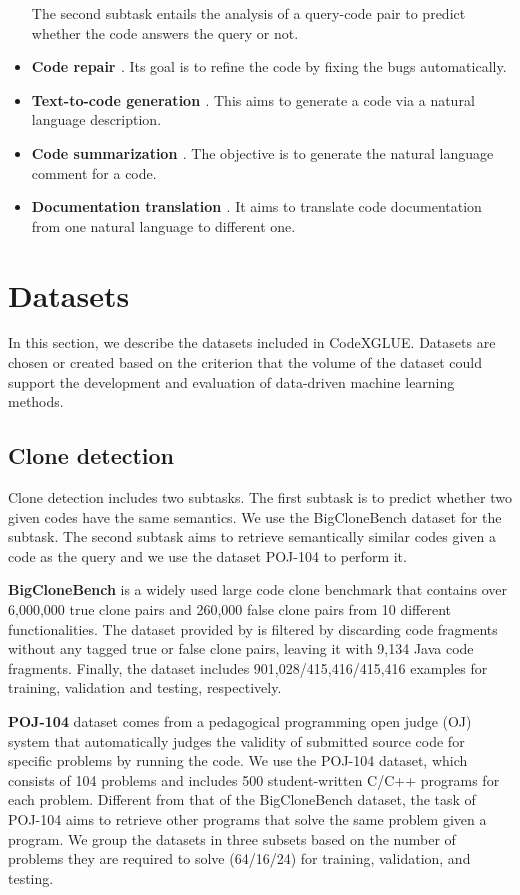 \documentclass[sigconf,nonacm,screen]{acmart}
\begin{document}
\begin{itemize}
The second subtask entails the analysis of a query-code pair to predict whether the code answers the query or not. 
\item \textbf{Code repair \cite{tufano2019empirical}}. Its goal is to  refine the code by fixing the bugs automatically. 
    \item \textbf{Text-to-code generation \cite{iyer2018mapping}}. This aims to  generate a code via a natural language description. 
    \item \textbf{Code summarization \cite{iyer2016summarizing}}. The objective is to generate the natural language comment for a code. 
    \item \textbf{Documentation translation \cite{johnson2017google}}. It aims to  translate code documentation from one natural language to different one. 
    \end{itemize}


\section{Datasets}
In this section, we describe the datasets included in CodeXGLUE. Datasets are chosen or created based on the criterion that the volume of the dataset could support the development and evaluation of data-driven machine learning methods.


\subsection{Clone detection}
Clone detection includes two subtasks. The first subtask is to predict whether two given codes have the same semantics. We use the BigCloneBench \cite{svajlenko2014towards} dataset for the subtask.
The second subtask aims to retrieve semantically similar codes given a code as the query and we use the dataset POJ-104 \cite{mou2016convolutional} to perform it.



\textbf{BigCloneBench} is a widely used large code clone benchmark that contains over 6,000,000 true clone pairs and 260,000 false clone pairs from 10 different functionalities. The dataset provided by \citet{wang2020detecting} is filtered by discarding code fragments without any tagged true or false clone pairs, leaving it with 9,134 Java code fragments. Finally, the dataset includes 901,028/415,416/415,416 examples for training, validation and testing, respectively.      

\textbf{POJ-104} dataset \cite{mou2016convolutional} comes from a pedagogical programming open judge (OJ) system that automatically judges the validity of submitted source code for specific problems by running the code. We use the POJ-104 dataset, which consists of 104 problems and includes 500 student-written C/C++ programs for each problem. Different from that of the BigCloneBench dataset, the task of POJ-104 aims to retrieve other programs that solve the same problem given a program. 
We group the datasets in three subsets based on the number of problems they are required to solve (64/16/24) for training, validation, and testing.
\end{document}
